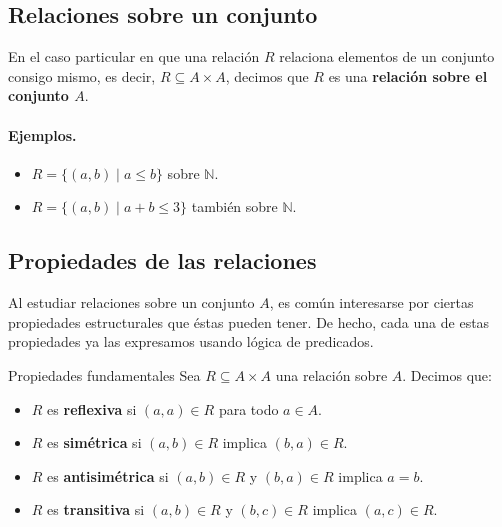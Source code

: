 \subsection{Relaciones sobre un conjunto}

En el caso particular en que una relación $R$ relaciona elementos de un conjunto consigo mismo, es decir, $R \subseteq A \times A$, decimos que $R$ es una \textbf{relación sobre el conjunto $A$}.

\paragraph{Ejemplos.}
\begin{itemize}
  \item $R = \{(a,b) \mid a \leq b\}$ sobre $\mathbb{N}$.
  \item $R = \{(a,b) \mid a + b \leq 3\}$ también sobre $\mathbb{N}$.
\end{itemize}

\subsection{Propiedades de las relaciones}

Al estudiar relaciones sobre un conjunto $A$, es común interesarse por ciertas propiedades estructurales que éstas pueden tener. 
De hecho, cada una de estas propiedades ya las expresamos usando lógica de predicados. 


\begin{definitionblock}{Propiedades fundamentales}
Sea $R \subseteq A \times A$ una relación sobre $A$. Decimos que:
\begin{itemize}
  \item $R$ es \textbf{reflexiva} si $(a,a) \in R$ para todo $a \in A$.
  \item $R$ es \textbf{simétrica} si $(a,b) \in R$ implica $(b,a) \in R$.
  \item $R$ es \textbf{antisimétrica} si $(a,b) \in R$ y $(b,a) \in R$ implica $a = b$.
  \item $R$ es \textbf{transitiva} si $(a,b) \in R$ y $(b,c) \in R$ implica $(a,c) \in R$.
\end{itemize}
\end{definitionblock}





